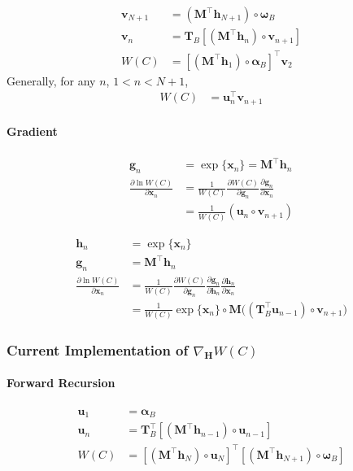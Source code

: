 \begin{align}
    \mathbf{v}_{N+1} &= (\mathbf{M}^\top \mathbf{h}_{N+1}) \circ \boldsymbol{\omega}_B \\
    \mathbf{v}_{n} &= \mathbf{T}_B [ (\mathbf{M}^\top \mathbf{h}_n) \circ \mathbf{v}_{n+1}] \\
    W(C) &= [(\mathbf{M}^\top \mathbf{h}_1) \circ \boldsymbol{\alpha}_B]^\top \mathbf{v}_2
\end{align}
Generally, for any $n$, $1 < n < N+1$, 
\begin{align}
    W(C) &= \mathbf{u}_n^\top \mathbf{v}_{n+1}
\end{align}

\paragraph{Gradient}

\begin{align} 
    \mathbf{g}_{n} &= \exp \{ \mathbf{x}_n \} = \mathbf{M}^\top \mathbf{h}_n\\
    \frac{\partial \ln W(C)}{\partial \mathbf{x}_{n}} &= \frac{1}{W(C)} \frac{\partial W(C)}{\partial \mathbf{g}_n} \frac{\partial \mathbf{g}_n}{\partial \mathbf{x}_n} \\ %
    &= \frac{1}{W(C)} (\mathbf{u}_n \circ \mathbf{v}_{n+1})
\end{align}

\begin{align} 
    \mathbf{h}_n &= \exp \{ \mathbf{x}_n \} \\
    \mathbf{g}_{n} &= \mathbf{M}^\top \mathbf{h}_{n} \\
    \frac{\partial \ln W(C)}{\partial \mathbf{x}_{n}} &= \frac{1}{W(C)} \frac{\partial W(C)}{\partial \mathbf{g}_n} \frac{\partial \mathbf{g}_n}{\partial \mathbf{h}_n} \frac{\partial \mathbf{h}_n}{\partial \mathbf{x}_n} \\
    &= \frac{1}{W(C)} \exp \{ \mathbf{x}_n \} \circ \mathbf{M} \Big( (\mathbf{T}_B^\top \mathbf{u}_{n-1}) \circ \mathbf{v}_{n+1} \Big)
\end{align}

\subsubsection{Current Implementation of $\nabla_\mathbf{H} W(C)$}
\paragraph{Forward Recursion}
\begin{align}
    \mathbf{u}_1 &= \boldsymbol{\alpha}_B \\
    \mathbf{u}_n &= \mathbf{T}_B^\top [ (\mathbf{M}^\top \mathbf{h}_{n-1}) \circ \mathbf{u}_{n-1} ] \\
    W(C) &= [(\mathbf{M}^\top \mathbf{h}_N) \circ \mathbf{u}_N]^\top [(\mathbf{M}^\top \mathbf{h}_{N+1}) \circ \boldsymbol{\omega}_B]
\end{align}

